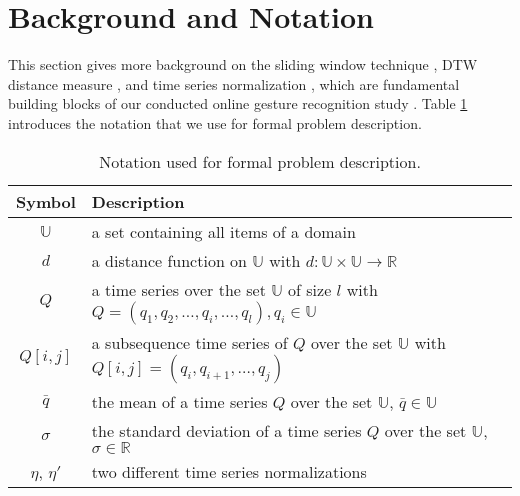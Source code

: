 \section{Background and Notation} \label{background_and_notation}

This section gives more background on the sliding window technique \cite{keogh2004sliding}, DTW distance measure \cite{keogh2002exact}, and time series normalization \cite{das1998rule}, which are fundamental building blocks of our conducted online gesture recognition study \cite{lesti2017filter}. Table \ref{tab:notation} introduces the notation that we use for formal problem description.

\begin{table}
    \begin{center}
        \begin{tabularx}{\textwidth}{c X}
            \hline
            \textbf{Symbol} \qquad & \textbf{Description}\\
            \hline
            $\mathbb{U}$ & a set containing all items of a domain\\
            $d$ & a distance function on $\mathbb{U}$ with $d: \mathbb{U} \times \mathbb{U} \to \mathbb{R}$\\
            $Q$ & a time series over the set $\mathbb{U}$ of size $l$ with
                $Q = (q_1, q_2, \dots, q_i, \dots, q_l), q_i \in \mathbb{U}$\\
            $Q[i,j]$ & a subsequence time series of $Q$ over the set $\mathbb{U}$ with
                $Q[i,j] = (q_i, q_{i+1}, \dots, q_{j})$\\
            $\bar{q}$ & the mean of a time series $Q$ over the set $\mathbb{U}$, $\bar{q} \in \mathbb{U}$\\
            $\sigma$ & the standard deviation of a time series $Q$ over the set $\mathbb{U}$, $\sigma \in \mathbb{R}$\\
            $\eta$, $\eta '$  & two different time series normalizations\\
            \hline
        \end{tabularx}
    \end{center}
    \caption{Notation used for formal problem description.}
	\label{tab:notation}
\end{table}



